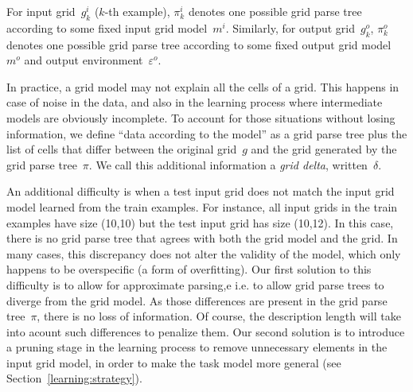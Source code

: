 \documentclass[a4paper]{llncs}
\newcommand{\KILL}[1]{}
\newcommand{\nat}{\mathbb{N}}
\begin{document}
For input grid~$g^i_k$ ($k$-th example), $\pi^i_k$ denotes one
possible grid parse tree according to some fixed input grid
model~$m^i$. Similarly, for output grid~$g^o_k$, $\pi^o_k$ denotes one
possible grid parse tree according to some fixed output grid
model~$m^o$ and output environment~$\varepsilon^o$.

In practice, a grid model may not explain all the cells of a
grid. This happens in case of noise in the data, and also in the
learning process where intermediate models are obviously
incomplete. To account for those situations without losing
information, we define ``data according to the model'' as a grid parse
tree plus the list of cells that differ between the original grid~$g$
and the grid generated by the grid parse tree~$\pi$. We call this
additional information a {\em grid delta}, written~$\delta$.
\KILL{Formally, a grid
delta is a set of triples~$(i,j,c) \in \nat \times \nat \times C$
stating that the cell at coordinates~$(i,j)$ has color~$c$ in~$g$,
which is different from the color specified by~$\pi$.}

An additional difficulty is when a test input grid does not match the
input grid model learned from the train examples. For instance, all
input grids in the train examples have size (10,10) but the test
input grid has size (10,12). In this case, there is no grid parse tree
that agrees with both the grid model and the grid. In many cases, this
discrepancy does not alter the validity of the model, which only
happens to be overspecific (a form of overfitting).
%
Our first solution to this difficulty is to allow for approximate
parsing,e i.e. to allow grid parse trees to diverge from the grid
model. As those differences are present in the grid parse tree~$\pi$,
there is no loss of information. Of course, the description length
will take into acount such differences to penalize them.
%
Our second solution is to introduce a pruning stage in the learning
process to remove unnecessary elements in the input grid model, in
order to make the task model more general (see
Section~\ref{learning:strategy}).
\end{document}
